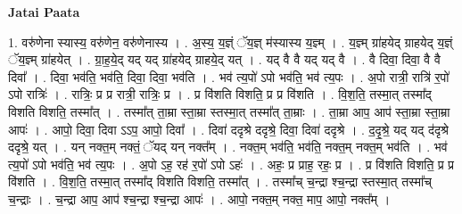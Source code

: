 \documentclass[17pt]{extarticle}
\begin{document}
\textbf{Jatai Paata} \newline

1. वरु॑णेना स्यास्य॒ वरु॑णेन॒ वरु॑णेनास्य । . अ॒स्य॒ य॒ज्ञ्ं ॅय॒ज्ञ् म॑स्यास्य य॒ज्ञ्म् । . य॒ज्ञ्म् ग्रा॑हयेद् ग्राहयेद् य॒ज्ञ्ं ॅय॒ज्ञ्म् ग्रा॑हयेत् । . ग्रा॒ह॒ये॒द् यद् यद् ग्रा॑हयेद् ग्राहये॒द् यत् । . यद् वै वै यद् यद् वै । . वै दिवा॒ दिवा॒ वै वै दिवा᳚ । . दिवा॒ भव॑ति॒ भव॑ति॒ दिवा॒ दिवा॒ भव॑ति । . भव॑ त्य॒पो॑ ऽपो भव॑ति॒ भव॑ त्य॒पः । . अ॒पो रात्री॒ रात्रि॑ र॒पो॑ ऽपो रात्रिः॑ । . रात्रिः॒ प्र प्र रात्री॒ रात्रिः॒ प्र । . प्र वि॑शति विशति॒ प्र प्र वि॑शति । . वि॒श॒ति॒ तस्मा॒त् तस्मा᳚द् विशति विशति॒ तस्मा᳚त् । . तस्मा᳚त् ता॒म्रा स्ता॒म्रा स्तस्मा॒त् तस्मा᳚त् ता॒म्राः । . ता॒म्रा आप॒ आप॑ स्ता॒म्रा स्ता॒म्रा आपः॑ । . आपो॒ दिवा॒ दिवा ऽऽप॒ आपो॒ दिवा᳚ । . दिवा॑ ददृश्रे ददृश्रे॒ दिवा॒ दिवा॑ ददृश्रे । . द॒दृ॒श्रे॒ यद् यद् द॑दृश्रे ददृश्रे॒ यत् । . यन् नक्त॒म् नक्तं॒ ॅयद् यन् नक्त᳚म् । . नक्त॒म् भव॑ति॒ भव॑ति॒ नक्त॒म् नक्त॒म् भव॑ति । . भव॑ त्य॒पो॑ ऽपो भव॑ति॒ भव॑ त्य॒पः । . अ॒पो ऽह॒ रह॑ र॒पो॑ ऽपो ऽहः॑ । . अहः॒ प्र प्राह॒ रहः॒ प्र । . प्र वि॑शति विशति॒ प्र प्र वि॑शति । . वि॒श॒ति॒ तस्मा॒त् तस्मा᳚द् विशति विशति॒ तस्मा᳚त् । . तस्मा᳚च् च॒न्द्रा श्च॒न्द्रा स्तस्मा॒त् तस्मा᳚च् च॒न्द्राः । . च॒न्द्रा आप॒ आप॑ श्च॒न्द्रा श्च॒न्द्रा आपः॑ । . आपो॒ नक्त॒म् नक्त॒ माप॒ आपो॒ नक्त᳚म् । \newline
\end{document}
